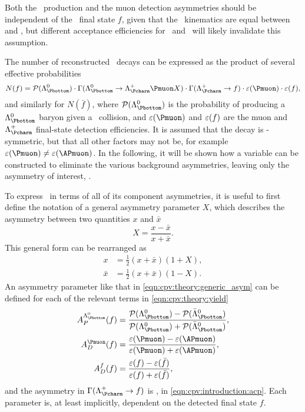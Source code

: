 Both the \PLambdab\ production and the muon detection asymmetries should be 
independent of the \PLambdac\ final state $f$, given that the \PLambdac\ 
kinematics are equal between \pKK and \ppipi, but different acceptance 
efficiencies for \pKK\ and \ppipi\ will likely invalidate this assumption.

The number of reconstructed \LcTof\ decays can be expressed as the product of 
several effective probabilities
\begin{equation}
  N(f) = \prob(\PLambdab)\cdot
         \Gamma(\LbToLcmuX)\cdot
         \Gamma(\LcTof)\cdot
         \eff(\Pmuon)\cdot
         \eff(f),
  \label{eqn:cpv:theory:yield}
\end{equation}
and similarly for $N(\bar{f})$, where $\prob(\PLambdab)$ is the probability of 
producing a $\PLambdab$ baryon given a \pp\ collision, and $\eff(\Pmuon)$ and 
$\varepsilon(f)$ are the muon and $\PLambdac$ final-state detection efficiencies.
It is assumed that the \LbToLcmuX decay is \CP-symmetric, but that all other 
factors may not be, for example $\eff(\Pmuon) \neq \eff(\APmuon)$.
In the following, it will be shown how a variable can be constructed to 
eliminate the various background asymmetries, leaving only the asymmetry of 
interest, \ACP\@.

To express \ARaw\ in terms of all of its component asymmetries, it is useful to 
first define the notation of a general asymmetry parameter $X$, which describes 
the asymmetry between two quantities $x$ and $\bar{x}$
\begin{equation}
  X = \frac{x - \bar{x}}{x + \bar{x}}.
  \label{eqn:cpv:theory:generic_asym}
\end{equation}
This general form can be rearranged as
\begin{align}
  x &= \frac{1}{2}(x + \bar{x})(1 + X),\label{eqn:cpv:theory:asym_form_one}\\
  \bar{x} &= \frac{1}{2}(x + \bar{x})(1 - X).\label{eqn:cpv:theory:asym_form_two}
\end{align}
An asymmetry parameter like that in \cref{eqn:cpv:theory:generic_asym} can be defined for each of the relevant terms in 
\cref{eqn:cpv:theory:yield}
\begin{align*}
  \APLb(f) &= \frac{%
    \prob(\PLambdab) - \prob(\APLambdab)
  }{%
    \prob(\PLambdab) + \prob(\APLambdab)
  },\\
  \ADmu(f) &= \frac{%
    \eff(\Pmuon) - \eff(\APmuon)
  }{%
    \eff(\Pmuon) + \eff(\APmuon)
  },\\
  \ADf(f)  &= \frac{%
    \eff(f) - \eff(\bar{f})
  }{%
    \eff(f) + \eff(\bar{f})
  },
\end{align*}
and the asymmetry in $\Gamma(\LcTof)$ is \ACP, in 
\cref{eqn:cpv:introduction:acp}.
Each parameter is, at least implicitly, dependent on the detected final state 
$f$.


